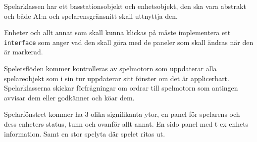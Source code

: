\documentclass[a4paper,8pt]{article}
\begin{document}
Spelarklassen har ett basstationsobjekt och enhetsobjekt, den ska vara 
abstrakt och både AI:n och spelarensgränsnitt skall uttnyttja den.

Enheter och allt annat som skall kunna klickas på måste implementera ett 
\texttt{interface} som anger vad den skall göra med de paneler som skall 
ändras när den är markerad.

Speletsflöden kommer kontrolleras av spelmotorn som uppdaterar alla 
spelareobjekt som i sin tur uppdaterar sitt fönster om det är applicerbart.
Spelarklasserna skickar förfrågningar om ordrar till spelmotorn som antingen
avvisar dem eller godkänner och köar dem.

Spelarfönstret kommer ha 3 olika signifikanta ytor, en panel för spelarens och
dess enheters status, tunn och ovanför allt annat. En sido panel med t ex 
enhets information. Samt en stor spelyta där spelet ritas ut.


%
\end{document}

